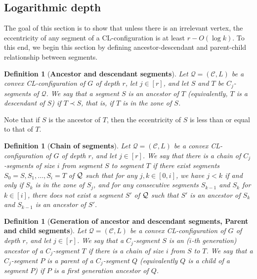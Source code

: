 \documentclass{article}
\newtheorem{definition}[theorem]{Definition}
\numberwithin{claimcounter}{lemma}
\begin{document}
\subsection{Logarithmic depth}\label{S:depth}

The goal of this section is to show that unless there is an irrelevant vertex, the eccentricity of any segment of a CL-configuration is at least $r-O(\log k)$.
To this end, we begin this section by defining ancestor-descendant and parent-child relationship between segments. 

\begin{definition}[\bf{Ancestor and descendant segments}]
Let $\mathcal{Q}=(\mathcal{C},L)$ be a  convex CL-configuration of $G$ of depth $r$, let $j\in[r]$, and let $S$ and $T$ be $C_j$-segments of $\mathcal{Q}$.
    We say that a segment $S$ is an \emph{ancestor} of $T$ (equivalently, $T$ is a \emph{descendant} of $S$) if $T \prec S$, that is, if $T$ is in the zone of $S$.
\end{definition}

Note that if $S$ is the ancestor of $T$, then the eccentricity of $S$ is less than or equal to that of $T$.

\begin{definition}[\bf{Chain of segments}]
Let $\mathcal{Q}=(\mathcal{C},L)$ be a  convex CL-configuration of $G$  of depth $r$, and let $j\in[r]$.  
    We say that there is a \emph{chain of $C_j$-segments of size $i$} from segment $S$ to segment $T$ if there exist segments $S_0 = S, S_1, \dots, S_i = T$ of ${\cal Q}$ such that for any $j, k \in [0,i]$, we have $j<k $ if and only if $S_k$ is in the zone of $S_j$, and for any consecutive segments $S_{k-1}$ and $ S_k$ for $k\in [i]$, there does not exist a segment $S'$ of ${\cal Q}$ such that $S'$ is an ancestor of $S_{k}$ and $S_{k-1}$ is an ancestor of $S'$.
\end{definition}


\begin{definition}[\bf{Generation of ancestor and descendant segments, Parent and child segments}]
Let $\mathcal{Q}=(\mathcal{C},L)$ be a  convex CL-configuration of $G$ of depth $r$, and let $j\in[r]$.
    We say that a $C_j$-segment $S$ is an \emph{($i$-th generation) ancestor} of a $C_j$-segment $T$ if there is a chain of size $i$ from $S$ to $T$. We say that a $C_j$-segment $P$ is a \emph{parent} of a $C_j$-segment $Q$ (equivalently $Q$ is a \emph{child} of a segment $P$) if $P$ is a first generation ancestor of $Q$.
\end{definition}
\end{document}
